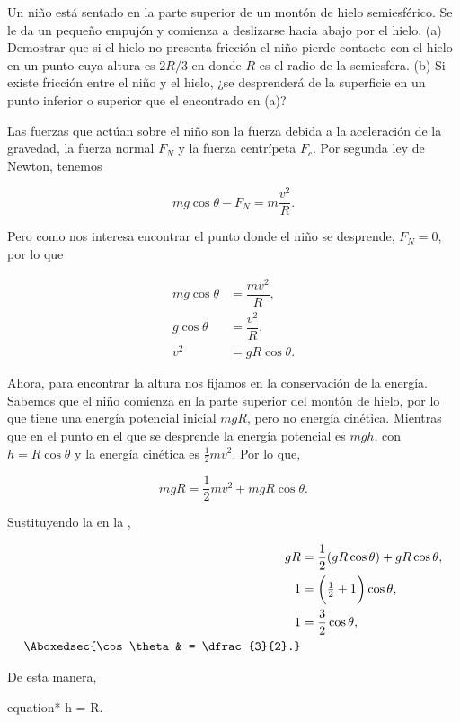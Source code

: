 \documentclass[../main.tex]{subfiles}
\begin{document}
\begin{problema}
	Un niño está sentado en la parte superior de un montón
	de hielo semiesférico. Se le da un pequeño empujón y
	comienza a deslizarse hacia abajo por el hielo.
	(a) Demostrar que si el hielo no presenta fricción
	el niño pierde contacto con el hielo en un punto
	cuya altura es \(2R/3\) en donde \(R\) es el radio
	de la semiesfera.
	(b) Si existe fricción entre el niño y el hielo,
	¿se desprenderá de la superficie en un punto inferior
	o superior que el encontrado en (a)?

	\startsolution

	Las fuerzas que actúan sobre el niño son la fuerza debida a la aceleración
	de la gravedad, la fuerza normal \(F_{N}\) y la fuerza centrípeta \(F_{c}\). Por
	segunda ley de Newton, tenemos

	\begin{equation*}
		mg\cos\theta - F_{N}  = m \dfrac{v^{2}}{R}.
	\end{equation*}

	Pero como nos interesa encontrar el punto donde el niño se desprende,
	\(F_{N} = 0\), por lo que

	\begin{align}
		mg\cos\theta & = \dfrac{mv^{2}}{R}, \nonumber  \\
		g\cos\theta  & = \dfrac{v^{2}}{R},\nonumber    \\
		v^{2}        & = gR\cos\theta.\label{eq:vSqrd}
	\end{align}

	Ahora, para encontrar la altura nos fijamos en la conservación de la energía. Sabemos
	que el niño comienza en la parte superior del montón de hielo, por lo que tiene una
	energía potencial inicial \(mgR\), pero no energía cinética. Mientras que en el punto
	en el que se desprende la energía potencial es \(mgh\), con \(h = R\cos\theta\) y
	la energía cinética es \(\tfrac{1}{2}mv^{2}\). Por lo que,

	\begin{equation}
		mgR = \dfrac{1}{2}mv^{2} + mgR\cos\theta.
		\label{eq:energy}
	\end{equation}

	Sustituyendo la  en la ,

	\begin{align*}
		gR                    & = \dfrac{1}{2}(gR\cos\theta) + gR\cos\theta, \\
		1                     & = \biggl(\tfrac{1}{2} + 1\biggr)\cos\theta,  \\
		1                     & = \dfrac{3}{2}\cos\theta,                    \\
		\Aboxedsec{\cos\theta & = \dfrac{3}{2}.}
	\end{align*}

	De esta manera,

	\begin{empheq}[box=\mainresult]{equation*}
		h = R.
	\end{empheq}

\end{problema}
\end{document}
